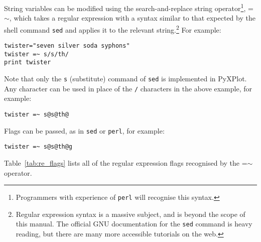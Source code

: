 String variables can be modified using the search-and-replace string
operator\footnote{Programmers with
experience of {\tt perl} will recognise this syntax.}, =$\sim$, which takes a regular expression with a syntax similar to that
expected by the shell command {\tt sed} and applies it to the relevant string.\footnote{Regular expression
syntax is a massive subject, and is beyond the scope of this manual. The
official GNU documentation for the {\tt sed} command is heavy reading, but
there are many more accessible tutorials on the web.} For example:

\begin{verbatim}
twister="seven silver soda syphons"
twister =~ s/s/th/
print twister
\end{verbatim}

Note that only the {\tt s} (substitute) command of {\tt sed} is implemented in
PyXPlot. Any character can be used in place of the {\tt /} characters in the
above example, for example:

\begin{verbatim}
twister =~ s@s@th@
\end{verbatim}

\noindent Flags can be passed, as in {\tt sed} or {\tt perl}, for example:

\begin{verbatim}
twister =~ s@s@th@g
\end{verbatim}

\noindent Table~\ref{tab:re_flags} lists all of the regular expression flags
recognised by the =$\sim$ operator.

